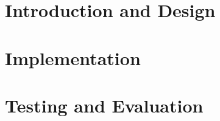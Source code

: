 



\makeatletter{}\makeatother%

\pagestyle{empty} %

\cleardoublepage

\cleardoublepage

\cleardoublepage
{}
\setcounter{tocdepth}{2}
\tableofcontents
\listoftodos
\cleardoublepage

\part{Introduction and Design}


\part{Implementation}

\part{Testing and Evaluation}




\newpage
\appendix


